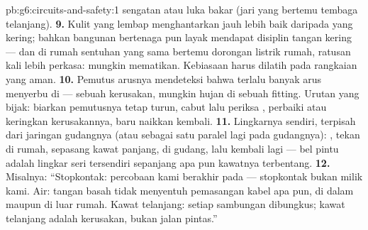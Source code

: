 \begin{solution}{pb:g6:circuits-and-safety:1}
sengatan atau luka bakar (jari yang bertemu tembaga telanjang).
\textbf{9.} Kulit yang lembap menghantarkan jauh lebih baik daripada
yang kering; bahkan bangunan bertenaga  pun layak mendapat
disiplin tangan kering --- dan di rumah sentuhan yang sama bertemu
dorongan listrik rumah, ratusan kali lebih perkasa: mungkin mematikan.
Kebiasaan harus dilatih pada rangkaian yang aman.
\textbf{10.} Pemutus arusnya mendeteksi bahwa terlalu banyak arus
menyerbu di  --- sebuah kerusakan, mungkin hujan di sebuah
fitting. Urutan yang bijak: biarkan pemutusnya tetap turun, cabut lalu
periksa , perbaiki atau keringkan kerusakannya, baru
naikkan kembali.
\textbf{11.} Lingkarnya sendiri, terpisah dari jaringan gudangnya
(atau sebagai satu  paralel lagi pada  gudangnya):
,  tekan di rumah, sepasang kawat panjang, 
di gudang, lalu kembali lagi --- bel pintu adalah lingkar seri
tersendiri sepanjang apa pun kawatnya terbentang.
\textbf{12.} Misalnya: ``Stopkontak: percobaan kami berakhir pada
 --- stopkontak bukan milik kami. Air: tangan basah tidak
menyentuh pemasangan kabel apa pun, di dalam maupun di luar rumah.
Kawat telanjang: setiap sambungan dibungkus; kawat telanjang adalah
kerusakan, bukan jalan pintas.''
\end{solution}
